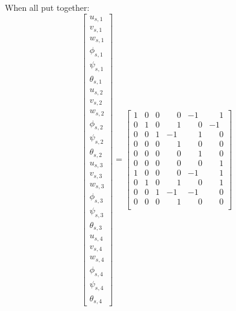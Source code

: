\documentclass[10pt,b5paper,titlepage]{book}
\begin{document}
When all put together:
\begin{equation}
    \begin{bmatrix}
        u_{s,1} \\
        v_{s,1} \\
        w_{s,1} \\
        \phi_{s,1} \\
        \psi_{s,1} \\
        \theta_{s,1} \\
        u_{s,2} \\
        v_{s,2} \\
        w_{s,2} \\
        \phi_{s,2} \\
        \psi_{s,2} \\
        \theta_{s,2} \\
        u_{s,3} \\
        v_{s,3} \\
        w_{s,3} \\
        \phi_{s,3} \\
        \psi_{s,3} \\
        \theta_{s,3} \\
        u_{s,4} \\
        v_{s,4} \\
        w_{s,4} \\
        \phi_{s,4} \\
        \psi_{s,4} \\
        \theta_{s,4}
    \end{bmatrix}
    = \begin{bmatrix}
        1 & 0 & 0 & \phantom{-}0 & -1 & \phantom{-}1 \\
        0 & 1 & 0 & \phantom{-}1 & \phantom{-}0 & -1 \\
        0 & 0 & 1 & -1 & \phantom{-}1 & \phantom{-}0 \\
        0 & 0 & 0 & \phantom{-}1 & \phantom{-}0 & \phantom{-}0 \\
        0 & 0 & 0 & \phantom{-}0 & \phantom{-}1 & \phantom{-}0 \\
        0 & 0 & 0 & \phantom{-}0 & \phantom{-}0 & \phantom{-}1 \\
        1 & 0 & 0 & \phantom{-}0 & -1 & \phantom{-}1 \\
        0 & 1 & 0 & \phantom{-}1 & \phantom{-}0 & \phantom{-}1 \\
        0 & 0 & 1 & -1 & -1 & \phantom{-}0 \\
        0 & 0 & 0 & \phantom{-}1 & \phantom{-}0 & \phantom{-}0 \\

\end{bmatrix}
\end{equation}
\end{document}

